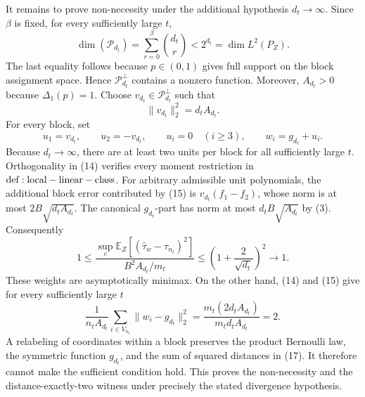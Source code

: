 It remains to prove non-necessity under the additional hypothesis \(d_t\to\infty\). Since \(\beta\) is fixed, for every sufficiently large \(t\),
\[
\dim(\mathcal P_{d_t})=\sum_{r=0}^{\beta}\binom{d_t}{r}<2^{d_t}=\dim L^2(P_Z).
\tag{13}
\]
The last equality follows because \(p\in(0,1)\) gives full support on the block assignment space. Hence \(\mathcal P_{d_t}^{\perp}\) contains a nonzero function. Moreover, \(A_{d_t}>0\) because \(\Delta_1(p)=1\). Choose \(v_{d_t}\in\mathcal P_{d_t}^{\perp}\) such that
\[
\|v_{d_t}\|_2^2=d_tA_{d_t}.
\tag{14}
\]
For every block, set
\[
u_1=v_{d_t},\qquad u_2=-v_{d_t},\qquad u_i=0\quad(i\ge3),
\qquad w_i=g_{d_t}+u_i.
\tag{15}
\]
Because \(d_t\to\infty\), there are at least two units per block for all sufficiently large \(t\). Orthogonality in (14) verifies every moment restriction in \({\rm def:local-linear-class}\). For arbitrary admissible unit polynomials, the additional block error contributed by (15) is \(v_{d_t}(f_1-f_2)\), whose norm is at most \(2B\sqrt{d_tA_{d_t}}\). The canonical \(g_{d_t}\)-part has norm at most \(d_tB\sqrt{A_{d_t}}\) by (3). Consequently
\[
1\le
\frac{\sup_c\mathbb E_Z[(\widehat\tau_w-\tau_{n_t})^2]}
{B^2A_{d_t}/m_t}
\le\left(1+\frac{2}{\sqrt{d_t}}\right)^2\longrightarrow1.
\tag{16}
\]
These weights are asymptotically minimax. On the other hand, (14) and (15) give for every sufficiently large \(t\)
\[
\frac{1}{n_tA_{d_t}}\sum_{i\in V_{n_t}}
\|w_i-g_{d_t}\|_2^2
=\frac{m_t(2d_tA_{d_t})}{m_td_tA_{d_t}}=2.
\tag{17}
\]
A relabeling of coordinates within a block preserves the product Bernoulli law, the symmetric function \(g_{d_t}\), and the sum of squared distances in (17). It therefore cannot make the sufficient condition hold. This proves the non-necessity and the distance-exactly-two witness under precisely the stated divergence hypothesis.